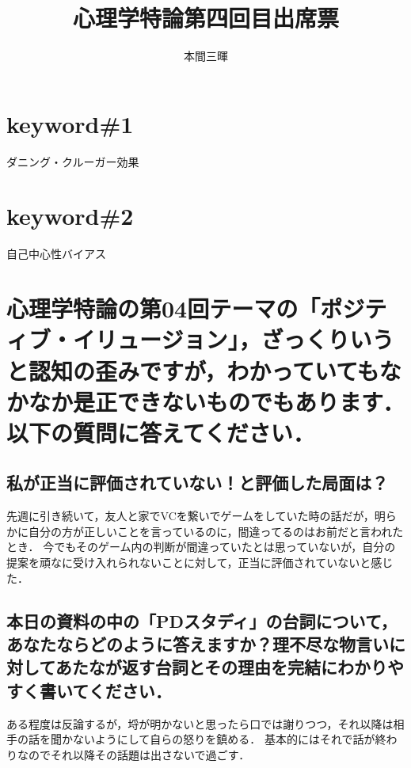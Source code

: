 \documentclass[titlepage,a4paper]{jsarticle}
\title{心理学特論第四回目出席票}
\author{本間三暉}
\begin{document}
\maketitle
\section*{keyword\#1}
ダニング・クルーガー効果
\section*{keyword\#2}
自己中心性バイアス

\section{心理学特論の第04回テーマの「ポジティブ・イリュージョン」，ざっくりいうと認知の歪みですが，わかっていてもなかなか是正できないものでもあります．以下の質問に答えてください．}
\subsection{私が正当に評価されていない！と評価した局面は？}
先週に引き続いて，友人と家でVCを繋いでゲームをしていた時の話だが，明らかに自分の方が正しいことを言っているのに，間違ってるのはお前だと言われたとき．
今でもそのゲーム内の判断が間違っていたとは思っていないが，自分の提案を頑なに受け入れられないことに対して，正当に評価されていないと感じた．

\subsection{本日の資料の中の「PDスタディ」の台詞について，あなたならどのように答えますか？理不尽な物言いに対してあたなが返す台詞とその理由を完結にわかりやすく書いてください．}
ある程度は反論するが，埒が明かないと思ったら口では謝りつつ，それ以降は相手の話を聞かないようにして自らの怒りを鎮める．
基本的にはそれで話が終わりなのでそれ以降その話題は出さないで過ごす．
\end{document}
